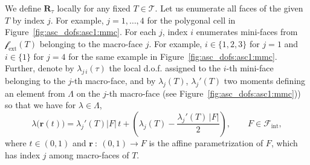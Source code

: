\documentclass[12pt]{article}
\newcommand{\vect}[1]{\boldsymbol{\mathbf{#1}}}
\newcommand{\bcell}{T}
\newcommand{\bmesh}{{\vect{\mathcal T}}}
\newcommand{\mmesh}{{\vect{\mathcal \tau}}}
\newcommand{\bfaces}[1][]{{\vect{\mathcal F}_{\text{#1}}}}
\newcommand{\mfaces}[1][]{{\vect{\mathcal f}_{\text{#1}}}}
\begin{document}
We define $\vect R_\mmesh$ locally for any fixed $\bcell\in\bmesh$. Let us enumerate all faces of the given $T$ by index $j$. For example, $j=1,\dots,4$ for the polygonal cell in Figure~\ref{fig:asc_dofs:asc1:mmc}. For each $j$, index $i$ enumerates mini-faces from $\mfaces[ext](T)$ belonging to the macro-face $j$. For example, $i\in\{1,2,3\}$ for $j=1$ and $i\in\{1\}$ for $j=4$ for the same example in Figure~\ref{fig:asc_dofs:asc1:mmc}. Further, denote by $\lambda_{j\,i}(\mmesh)$ the local d.o.f. assigned to the $i$-th mini-face belonging to the $j$-th macro-face, and by $\lambda_{j}(T)$, $\lambda_{j}'(T)$ two moments defining an element from $\Lambda$ on the $j$-th macro-face \big(see Figure~\ref{fig:asc_dofs:asc1:mmc})\big) so that
we have for $\lambda\in\Lambda$,
\begin{equation}\label{lambda_intermsof_moments}
	{\lambda}\big({\vect r}(t)\big) = \lambda_{j}'(T)|F|\,t + \left( \lambda_{j}(T) - \frac{\lambda_{j}'(T)\,|F|}{2} \right),\qquad  F\in\bfaces[int],
\end{equation}
where $t\in(0,1)$ and ${\vect r}\::\:\left(0,1\right) \rightarrow F$ is the affine parametrization of $F$, which has index $j$ among macro-faces of $T$.
\end{document}
